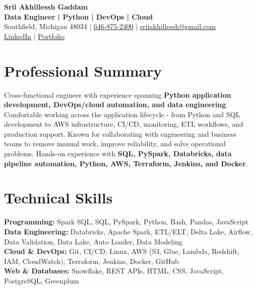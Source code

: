 \documentclass[letterpaper,10pt]{article}
\begin{document}
\fontsize{9.35pt}{10.45pt}\selectfont

\begin{center}
    {\LARGE \textbf{Srii Akhillessh Gaddam}} \\[-1pt]
    \textbf{Data Engineer | Python | DevOps | Cloud} \\[2pt]
    Southfield, Michigan 48034 $|$
    \href{tel:6468752400}{646-875-2400} $|$
    \href{mailto:sriiakhillessh@gmail.com}{sriiakhillessh@gmail.com} \\[1pt]
    \href{https://www.linkedin.com/in/srii-akhiilessh-gaddam-b48668191/}{LinkedIn} $|$
    \href{https://sriiakhillesshg.github.io/portfolio/}{Portfolio}
\end{center}
\vspace{-8pt}

\section{Professional Summary}
\small{Cross-functional engineer with experience spanning \textbf{Python application development, DevOps/cloud automation, and data engineering}. Comfortable working across the application lifecycle - from Python and SQL development to AWS infrastructure, CI/CD, monitoring, ETL workflows, and production support. Known for collaborating with engineering and business teams to remove manual work, improve reliability, and solve operational problems. Hands-on experience with \textbf{SQL, PySpark, Databricks, data pipeline automation, Python, AWS, Terraform, Jenkins, and Docker}.}

\section{Technical Skills}
\small{
\textbf{Programming:} Spark SQL, SQL, PySpark, Python, Bash, Pandas, JavaScript \\
\textbf{Data Engineering:} Databricks, Apache Spark, ETL/ELT, Delta Lake, Airflow, Data Validation, Data Lake, Auto Loader, Data Modeling \\
\textbf{Cloud \& DevOps:} Git, CI/CD, Linux, AWS (S3, Glue, Lambda, Redshift, IAM, CloudWatch), Terraform, Jenkins, Docker, GitHub \\
\textbf{Web \& Databases:} Snowflake, REST APIs, HTML, CSS, JavaScript, PostgreSQL, Greenplum
}
\end{document}
